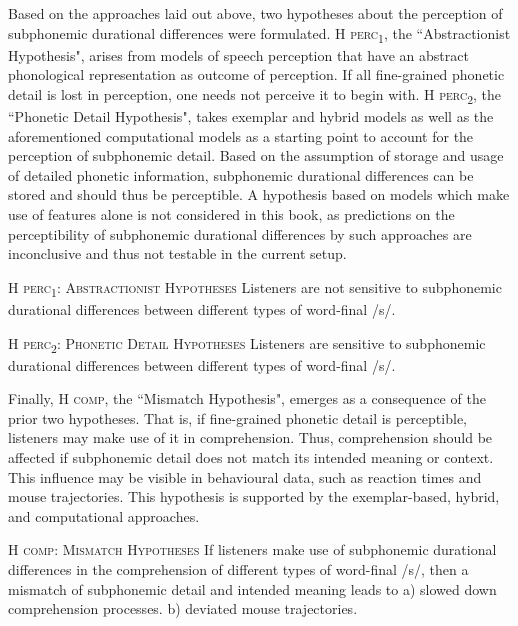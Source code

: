 Based on the approaches laid out above, two hypotheses about the perception of subphonemic durational differences were formulated. \textsc{H perc\textsubscript{1}}, the ``Abstractionist Hypothesis", arises from models of speech perception that have an abstract phonological representation as outcome of perception. If all fine-grained phonetic detail is lost in perception, one needs not perceive it to begin with. \textsc{H perc\textsubscript{2}}, the ``Phonetic Detail Hypothesis", takes exemplar and hybrid models as well as the aforementioned computational models as a starting point to account for the perception of subphonemic detail. Based on the assumption of storage and usage of detailed phonetic information, subphonemic durational differences can be stored and should thus be perceptible. A hypothesis based on models which make use of features alone is not considered in this book, as predictions on the perceptibility of subphonemic durational differences by such approaches are inconclusive and thus not testable in the current setup.

\begin{description}
\item\textsc{H perc\textsubscript{1}}: \textsc{Abstractionist Hypotheses} \newline
Listeners are not sensitive to subphonemic durational differences between different types of word-final /s/.

\item\textsc{H perc\textsubscript{2}}: \textsc{Phonetic Detail Hypotheses} \newline
Listeners are sensitive to subphonemic durational differences between different types of word-final /s/.
\end{description}

Finally, \textsc{H comp}, the ``Mismatch Hypothesis", emerges as a consequence of the prior two hypotheses. That is, if fine-grained phonetic detail is perceptible, listeners may make use of it in comprehension. Thus, comprehension should be affected if subphonemic detail does not match its intended meaning or context. This influence may be visible in behavioural data, such as reaction times and mouse trajectories. This hypothesis is supported by the exemplar-based, hybrid, and computational approaches.

\begin{description}

\item\textsc{H comp}: \textsc{Mismatch Hypotheses} \newline
If listeners make use of subphonemic durational differences in the comprehension of different types of word-final /s/, then a mismatch of subphonemic detail and intended meaning leads to\newline
a) slowed down comprehension processes.\newline
b) deviated mouse trajectories.

\end{description}

